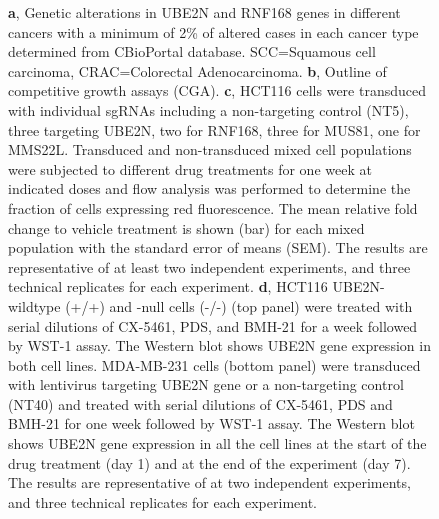 \addtocounter{figure}{-1}
\begin{figure}
  \caption{
        \newline
        \textbf{a}, Genetic alterations in UBE2N and RNF168 genes in different cancers with a minimum of 2\% of altered cases in each cancer type determined from CBioPortal database. SCC=Squamous cell carcinoma, CRAC=Colorectal Adenocarcinoma.
        \newline
        \textbf{b}, Outline of competitive growth assays (CGA).
        \newline
        \textbf{c}, HCT116 cells were transduced with individual sgRNAs including a non-targeting control (NT5), three targeting UBE2N, two for RNF168, three for MUS81, one for MMS22L. Transduced and non-transduced mixed cell populations were subjected to different drug treatments for one week at indicated doses and flow analysis was performed to determine the fraction of cells expressing red fluorescence. The mean relative fold change to vehicle treatment is shown (bar) for each mixed population with the standard error of means (SEM). The results are representative of at least two independent experiments, and three technical replicates for each experiment.
        \newline
        \textbf{d}, HCT116 UBE2N-wildtype (+/+) and -null cells (-/-) (top panel) were treated with serial dilutions of CX-5461, PDS, and BMH-21 for a week followed by WST-1 assay. The Western blot shows UBE2N gene expression in both cell lines. MDA-MB-231 cells (bottom panel) were transduced with lentivirus targeting UBE2N gene or a non-targeting control (NT40) and treated with serial dilutions of CX-5461, PDS and BMH-21 for one week followed by WST-1 assay. The Western blot shows UBE2N gene expression in all the cell lines at the start of the drug treatment (day 1) and at the end of the experiment (day 7). The results are representative of at two independent experiments, and three technical replicates for each experiment.
        }
\end{figure}
\clearpage


